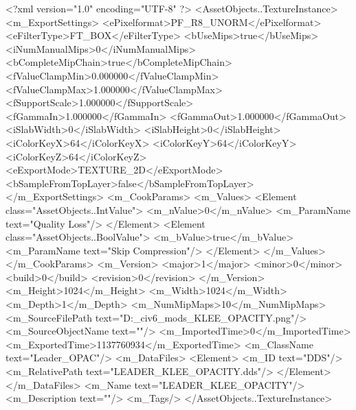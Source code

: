 <?xml version="1.0" encoding="UTF-8" ?>
<AssetObjects..TextureInstance>
	<m_ExportSettings>
		<ePixelformat>PF_R8_UNORM</ePixelformat>
		<eFilterType>FT_BOX</eFilterType>
		<bUseMips>true</bUseMips>
		<iNumManualMips>0</iNumManualMips>
		<bCompleteMipChain>true</bCompleteMipChain>
		<fValueClampMin>0.000000</fValueClampMin>
		<fValueClampMax>1.000000</fValueClampMax>
		<fSupportScale>1.000000</fSupportScale>
		<fGammaIn>1.000000</fGammaIn>
		<fGammaOut>1.000000</fGammaOut>
		<iSlabWidth>0</iSlabWidth>
		<iSlabHeight>0</iSlabHeight>
		<iColorKeyX>64</iColorKeyX>
		<iColorKeyY>64</iColorKeyY>
		<iColorKeyZ>64</iColorKeyZ>
		<eExportMode>TEXTURE_2D</eExportMode>
		<bSampleFromTopLayer>false</bSampleFromTopLayer>
	</m_ExportSettings>
	<m_CookParams>
		<m_Values>
			<Element class="AssetObjects..IntValue">
				<m_nValue>0</m_nValue>
				<m_ParamName text="Quality Loss"/>
			</Element>
			<Element class="AssetObjects..BoolValue">
				<m_bValue>true</m_bValue>
				<m_ParamName text="Skip Compression"/>
			</Element>
		</m_Values>
	</m_CookParams>
	<m_Version>
		<major>1</major>
		<minor>0</minor>
		<build>0</build>
		<revision>0</revision>
	</m_Version>
	<m_Height>1024</m_Height>
	<m_Width>1024</m_Width>
	<m_Depth>1</m_Depth>
	<m_NumMipMaps>10</m_NumMipMaps>
	<m_SourceFilePath text="D:\Documents\GitHub\Uzuki_civ6_mods\Mondstadt\LEADER_KLEE_OPACITY.png"/>
	<m_SourceObjectName text=""/>
	<m_ImportedTime>0</m_ImportedTime>
	<m_ExportedTime>1137760934</m_ExportedTime>
	<m_ClassName text="Leader_OPAC"/>
	<m_DataFiles>
		<Element>
			<m_ID text="DDS"/>
			<m_RelativePath text="LEADER_KLEE_OPACITY.dds"/>
		</Element>
	</m_DataFiles>
	<m_Name text="LEADER_KLEE_OPACITY"/>
	<m_Description text=""/>
	<m_Tags/>
</AssetObjects..TextureInstance>

